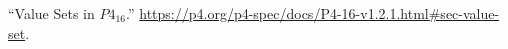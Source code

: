 \documentclass[11pt]{article}
\begin{document}
{{\begin{thebibliography}{44}
\mdbibitemlabel{{}[44]}\textquotedblleft{}Value Sets in $P4_{16}$.\textquotedblright{} \href{https://p4.org/p4-spec/docs/P4-16-v1.2.1.html\%23sec-value-set}{{\ttfamily https://\hspace{0pt}p4.\hspace{0pt}org/\hspace{0pt}p4-\hspace{0pt}spec/\hspace{0pt}docs/\hspace{0pt}P4-\hspace{0pt}16-\hspace{0pt}v1.\hspace{0pt}2.\hspace{0pt}1.\hspace{0pt}html\#\hspace{0pt}sec-\hspace{0pt}value-\hspace{0pt}set}}.\label{p4valuesets}%
\par%
\end{thebibliography}}%
}%
\end{document}
